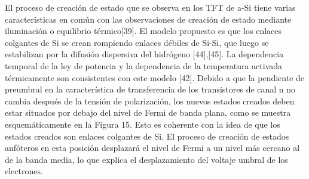 \documentclass[conference]{IEEEtran}
\begin{document}
    El proceso de creación de estado que se observa en los TFT de a-Si tiene varias características 
    en común con las observaciones de creación de estado mediante iluminación o equilibrio térmico[39]. 
    El modelo propuesto es que los enlaces colgantes de Si se crean rompiendo enlaces débiles de 
    Si-Si, que luego se estabilizan por la difusión dispersiva del hidrógeno [44],[45]. La 
    dependencia temporal de la ley de potencia y la dependencia de la temperatura activada 
    térmicamente son consistentes con este modelo [42]. Debido a que la pendiente de preumbral en la 
    característica de transferencia de los transistores de canal n no cambia después de la tensión 
    de polarización, los nuevos estados creados deben estar situados por debajo del nivel de Fermi de 
    banda plana, como se muestra esquemáticamente en la Figura 15. Esto es coherente con la idea de 
    que los estados creados son enlaces colgantes de Si. El proceso de creación de estados anfóteros 
    en esta posición desplazará el nivel de Fermi a un nivel más cercano al de la banda media, lo que 
    explica el desplazamiento del voltaje umbral de los electrones.
\end{document}
